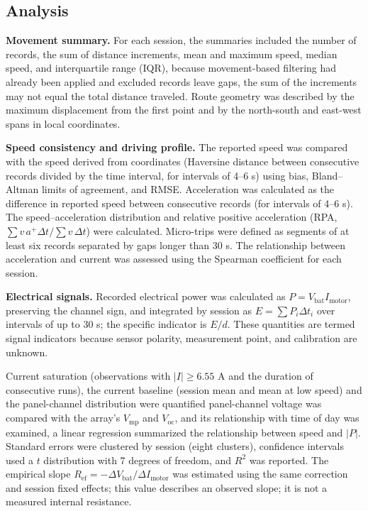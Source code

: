 \documentclass[vehicles,article,submit,moreauthors]{Definitions/mdpi}
\begin{document}
\subsection{Analysis}

\textbf{Movement summary.} For each session, the summaries included the number of records, the sum of distance increments, mean and maximum speed, median speed, and interquartile range (IQR), because movement-based filtering had already been applied and excluded records leave gaps, the sum of the increments may not equal the total distance traveled. Route geometry was described by the maximum displacement from the first point and by the north-south and east-west spans in local coordinates.

\textbf{Speed consistency and driving profile.} The reported speed was compared with the speed derived from coordinates (Haversine distance between consecutive records divided by the time interval, for intervals of 4--6 s) using bias, Bland--Altman limits of agreement, and RMSE. Acceleration was calculated as the difference in reported speed between consecutive records (for intervals of 4--6 s). The speed--acceleration distribution and relative positive acceleration (RPA, $\sum v\,a^{+}\Delta t/\sum v\,\Delta t$) were calculated. Micro-trips were defined as segments of at least six records separated by gaps longer than 30 s. The relationship between acceleration and current was assessed using the Spearman coefficient for each session.

\textbf{Electrical signals.} Recorded electrical power was calculated as $P=V_{\mathrm{bat}}I_{\mathrm{motor}}$, preserving the channel sign, and integrated by session as $E=\sum P_i\Delta t_i$ over intervals of up to 30 s; the specific indicator is $E/d$. These quantities are termed signal indicators because sensor polarity, measurement point, and calibration are unknown.

Current saturation (observations with $|I|\ge 6.55$ A and the duration of consecutive runs), the current baseline (session mean and mean at low speed) and the panel-channel distribution were quantified panel-channel voltage was compared with the array's $V_{\mathrm{mp}}$ and $V_{\mathrm{oc}}$, and its relationship with time of day was examined, a linear regression summarized the relationship between speed and $|P|$. Standard errors were clustered by session (eight clusters), confidence intervals used a $t$ distribution with 7 degrees of freedom, and $R^2$ was reported. The empirical slope $R_{\mathrm{ef}}=-\Delta V_{\mathrm{bat}}/\Delta I_{\mathrm{motor}}$ was estimated using the same correction and session fixed effects; this value describes an observed slope; it is not a measured internal resistance.
\end{document}

